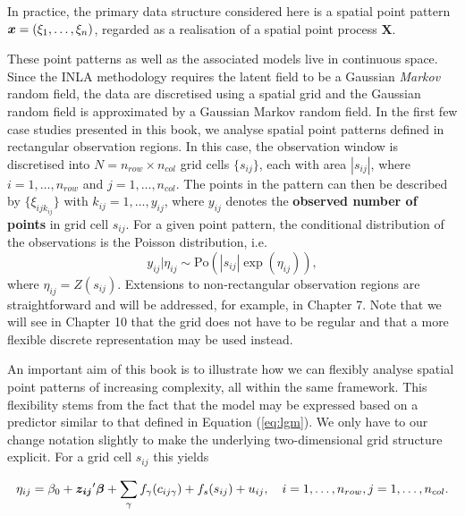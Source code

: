 In practice, the primary data structure considered here is a spatial point pattern $\boldsymbol{x}=(\xi_1,
\ldots, \xi_n)$, regarded as a realisation of a spatial point
process $\mathbf{X}$. 

These point patterns as well as the associated models live in continuous space. Since the INLA methodology requires the latent field to be a Gaussian \textit{Markov} random field, the data are discretised using a spatial grid and the Gaussian random field is approximated by a Gaussian Markov random field. In the first few case studies presented in this book, we analyse spatial point patterns defined in rectangular observation regions.  In this case, the observation window is discretised into $N =
n_{row} \times n_{col}$ grid cells $\{ s_{ij}\}$, each with area
$|s_{ij}|$, where $i = 1, \ldots, n_{row}$ and $ j = 1, \ldots, n_{col}$. The
points in the pattern can then be described by $\{\xi_{ijk_{ij}}\}$
with $k_{ij} = 1, \ldots, y_{ij}$, where $y_{ij}$ denotes the \textbf{observed
number of points} in grid cell $s_{ij}$. For a given point pattern, the conditional distribution of the observations is the Poisson distribution, i.e.
\begin{equation}
    \label{poisson} y_{ij}| \eta_{ij} \sim \mbox{Po}(|s_{ij}| \exp(\eta_{ij})),
\end{equation}
where $ \eta_{ij} = {Z}(s_{ij})$.
Extensions to non-rectangular observation regions are straightforward and will be addressed, for example, in Chapter 7.
Note that we will see in Chapter 10 that the grid does not have to be regular and that a more flexible discrete representation may be used instead. 

An important aim of this book is to illustrate how we can flexibly analyse spatial point patterns of increasing complexity, all within the same framework. This flexibility stems from the fact that the model may be expressed based on a predictor similar to that defined in Equation (\ref{eq:lgm}). We only have to our change notation slightly to make the underlying two-dimensional grid structure explicit. For a grid cell $s_{ij}$ this yields

\begin{equation}
\eta_{ij}=\beta_0+\boldsymbol{z_{ij}}'\boldsymbol{\beta}+\sum_{\gamma} f_{\gamma}(c_{ij \gamma})+f_s(s_{ij})+u_{ij},\quad i=1,\ldots, n_{row}, j=1,\ldots , n_{col}. \label{eq:linpred}
\end{equation}

